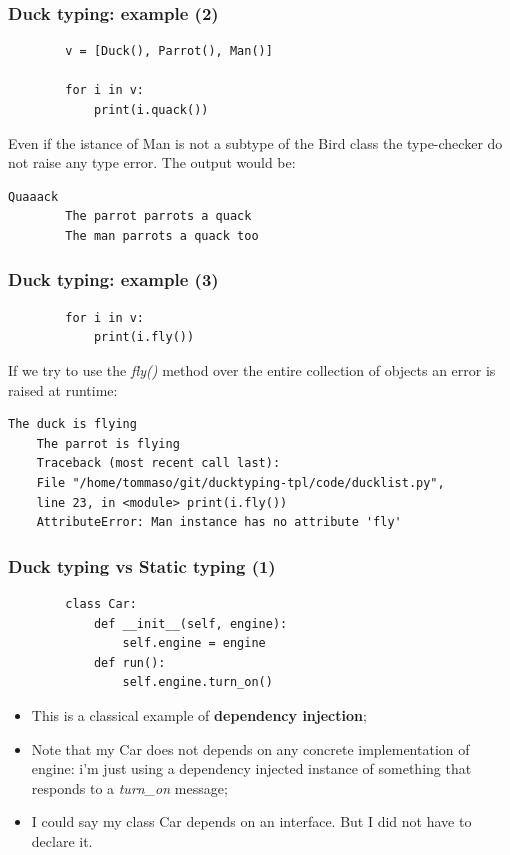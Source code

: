 \documentclass[xcolor ={table,usenames,dvipsnames}]{beamer}
\theoremstyle{definition}
\begin{document}
	\begin{frame}[fragile]
		\frametitle{Duck typing: example (2)}
		\begin{lstlisting}	
		v = [Duck(), Parrot(), Man()]
		
		for i in v:
			print(i.quack())
		\end{lstlisting}
		Even if the istance of Man is not a subtype of the Bird class the type-checker do not raise any type error. The output would be:
		
		\begin{lstlisting}[keywordstyle=\color{black},
		commentstyle=\color{black},
		stringstyle=\color{black}.]	
		Quaaack
		The parrot parrots a quack
		The man parrots a quack too
		\end{lstlisting}
		
		
		
	\end{frame}

	\begin{frame}[fragile]
		\frametitle{Duck typing: example (3)}
		\begin{lstlisting}	
		for i in v:
			print(i.fly())
		\end{lstlisting}
		If we try to use the \textit{fly()} method  over the entire collection of objects an error is raised at runtime:
			\begin{lstlisting}[keywordstyle=\color{black},
		commentstyle=\color{black},
	stringstyle=\color{black}.]	
	The duck is flying
	The parrot is flying
	Traceback (most recent call last):
	File "/home/tommaso/git/ducktyping-tpl/code/ducklist.py", 
	line 23, in <module> print(i.fly())
	AttributeError: Man instance has no attribute 'fly'
		\end{lstlisting}
	\end{frame}

	\begin{frame}[fragile]
		\frametitle{Duck typing vs Static typing (1)}
		\begin{lstlisting}
		class Car:
			def __init__(self, engine):
				self.engine = engine
			def run():
				self.engine.turn_on()			
		\end{lstlisting}
		
		\begin{itemize}
			\item This is a classical example of \textbf{dependency injection};
			\item Note that my Car does not depends on any concrete implementation of engine: i'm just using a dependency injected instance of something that responds to a \textit{turn\_on} message;
			\item I could say my class Car depends on an interface. But I did not have to declare it. %
		\end{itemize}	
	\end{frame}
	
\end{document}
